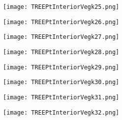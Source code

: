 \documentclass[pdf]{beamer}
\begin{document}
\begin{frame}
\begin{figure}[!h]
\centering
\texttt{[image: TREEPtInteriorVegk25.png]}
\end{figure}
\end{frame}

\begin{frame}
\begin{figure}[!h]
\centering
\texttt{[image: TREEPtInteriorVegk26.png]}
\end{figure}
\end{frame}

\begin{frame}
\begin{figure}[!h]
\centering
\texttt{[image: TREEPtInteriorVegk27.png]}
\end{figure}
\end{frame}

\begin{frame}
\begin{figure}[!h]
\centering
\texttt{[image: TREEPtInteriorVegk28.png]}
\end{figure}
\end{frame}

\begin{frame}
\begin{figure}[!h]
\centering
\texttt{[image: TREEPtInteriorVegk29.png]}
\end{figure}
\end{frame}

\begin{frame}
\begin{figure}[!h]
\centering
\texttt{[image: TREEPtInteriorVegk30.png]}
\end{figure}
\end{frame}

\begin{frame}
\begin{figure}[!h]
\centering
\texttt{[image: TREEPtInteriorVegk31.png]}
\end{figure}
\end{frame}

\begin{frame}
\begin{figure}[!h]
\centering
\texttt{[image: TREEPtInteriorVegk32.png]}
\end{figure}
\end{frame}
\end{document}
